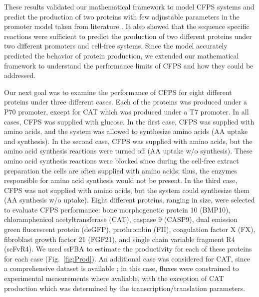 \documentclass[journal=asbcd6,manuscript=article]{achemso}
\begin{document}
These results validated our mathematical framework to model CFPS systems and predict the production of two proteins with few adjustable parameters in the promoter model taken from literature \cite{Moon:2012aa}.
It also showed that the sequence specific reactions were sufficient to predict the production of two different proteins under two different promoters and cell-free systems.
Since the model accurately predicted the behavior of protein production, we extended our mathematical framework to understand the performance limits of CFPS and how they could be addressed.

Our next goal was to examine the performance of CFPS for eight different proteins under three different cases.
Each of the proteins was produced under a P70 promoter, except for CAT which was produced under a T7 promoter.
In all cases, CFPS was supplied with glucose.
In the first case, CFPS was supplied with amino acids, and the system was allowed to synthesize amino acids (AA uptake and synthesis).
In the second case, CFPS was supplied with amino acids, but the amino acid synthesis reactions were turned off (AA uptake w/o synthesis).
These amino acid synthesis reactions were blocked since during the cell-free extract preparation the cells are often supplied with amino acids; thus, the enzymes responsible for amino acid synthesis would not be present.
In the third case, CFPS was not supplied with amino acids, but the system could synthesize them (AA synthesis w/o uptake).  
Eight different proteins, ranging in size, were selected to evaluate CFPS performance: bone morphogenetic protein 10 (BMP10), chloramphenicol acetyltransferase (CAT), caspase 9 (CASP9), dual emission green fluorescent protein (deGFP), prothrombin (FII), coagulation factor X (FX), fibroblast growth factor 21 (FGF21), and single chain variable fragment R4 (scFvR4).
We used ssFBA to estimate the productivity for each of these proteins for each case (Fig.~\ref{fig:Prod}).
An additional case was considered for CAT, since a comprehensive dataset is available \cite{2005_calhoun_BiotechnologyProgress}; in this case, fluxes were constrained to experimental measurements where avaliable, with the exception of CAT production which was determined by the transcription/translation parameters.
\end{document}
